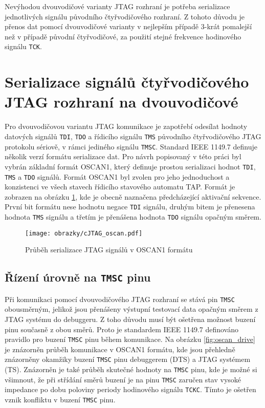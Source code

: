 Nevýhodou dvouvodičové varianty \acs{JTAG} rozhraní je potřeba serializace jednotlivých signálu původního čtyřvodičového rozhraní. Z tohoto důvodu je přenos dat pomocí dvouvodičové varianty v nejlepším případě 3-krát pomalejší než v případě původní čtyřvodičové, za použití stejné frekvence hodinového signálu \texttt{\acs{TCK}}. \cite{IEEE_1149-7}

\section{Serializace signálů čtyřvodičového \acs{JTAG} rozhraní na dvouvodičové}	\label{sec:oscan1} 
Pro dvouvodičovou variantu \acs{JTAG} komunikace je zapotřebí odesílat hodnoty datových signálů {\texttt{\acs{TDI}}}, {\texttt{\acs{TDO}}} a řídicího signálu \texttt{\acs{TMS}} původního čtyřvodičového \acs{JTAG} protokolu sériově, v rámci jediného signálu \texttt{\acs{TMSC}}. Standard IEEE 1149.7 definuje několik verzí formátu serializace dat. Pro návrh popisovaný v této práci byl vybrán základní formát OSCAN1, který definuje prostou serializaci hodnot \texttt{\acs{TDI}}, \texttt{\acs{TMS}} a \texttt{\acs{TDO}} signálů. Formát OSCAN1 byl zvolen pro jeho jednoduchost a konzistenci ve všech stavech řídicího stavového automatu \acs{TAP}. Formát je zobrazen na obrázku \ref{fig:oscan}, kde je obecně naznačena předcházející aktivační sekvence. První bit formátu nese hodnotu negace \texttt{\acs{TDI}} signálu, druhým bitem je přenesena hodnota \texttt{\acs{TMS}} signálu a třetím je přenášena hodnota \texttt{\acs{TDO}} signálu opačným směrem. \cite{IEEE_1149-7}

\begin{figure}[!h]
  \begin{center}
    \texttt{[image: obrazky/cJTAG\_oscan.pdf]}
  \end{center}
  \caption{Průběh serializace \acs{JTAG} signálů v OSCAN1 formátu}
	\label{fig:oscan}
\end{figure}
    
\subsection{Řízení úrovně na \texttt{\acs{TMSC}} pinu}	\label{subsec:oscan1_drive} 
Při komunikaci pomocí dvouvodičového \acs{JTAG} rozhraní se stává pin \texttt{\acs{TMSC}} obousměrným, jelikož jsou přenášeny výstupní testovací data opačným směrem z \acs{JTAG} systému do debuggeru. Z toho důvodu musí být ošetřena možnost buzení pinu současně z obou směrů. Proto je standardem IEEE 1149.7 definováno pravidlo pro buzení \texttt{\acs{TMSC}} pinu během komunikace. Na obrázku \ref{fig:oscan_drive} je znázorněn průběh komunikace v OSCAN1 formátu, kde jsou přehledně znázorněny okamžiky buzení \texttt{\acs{TMSC}} pinu debuggerem (\acs{DTS}) a \acs{JTAG} systémem (\acs{TS}). Znázorněn je také průběh skutečné hodnoty na \texttt{\acs{TMSC}} pinu, kde je možné si všimnout, že při střídání směrů buzení je na pinu \texttt{\acs{TMSC}} zaručen stav vysoké impedance po dobu poloviny periody hodinového signálu \texttt{\acs{TCKC}}. Tímto je ošetřen vznik konfliktu v buzení \texttt{\acs{TMSC}} pinu. \cite{IEEE_1149-7}

